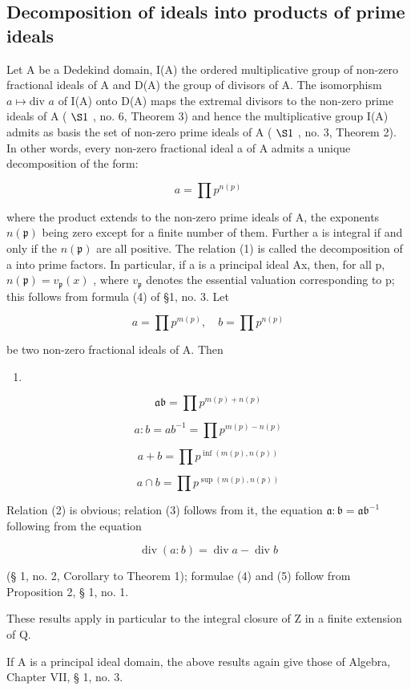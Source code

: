 \subsection{Decomposition of ideals into products of prime ideals}

Let A be a Dedekind domain, I(A) the ordered multiplicative group of non-zero fractional ideals of A and D(A) the group of divisors of A. The isomorphism \(a \mapsto \text{div } a\) of I(A) onto D(A) maps the extremal divisors to the non-zero prime ideals of A ( \(\S 1\) , no. 6, Theorem 3) and hence the multiplicative group I(A) admits as basis the set of non-zero prime ideals of A ( \(\S 1\) , no. 3, Theorem 2). In other words, every non-zero fractional ideal a of A admits a unique decomposition of the form:

\[
a = \prod p ^ {n (p)}\tag{1}
\]

where the product extends to the non-zero prime ideals of A, the exponents \(n(\mathfrak{p})\) being zero except for a finite number of them. Further a is integral if and only if the \(n(\mathfrak{p})\) are all positive. The relation (1) is called the decomposition of a into prime factors. In particular, if a is a principal ideal Ax, then, for all p, \(n(\mathfrak{p}) = v_{\mathfrak{p}}(x)\) , where \(v_{\mathfrak{p}}\) denotes the essential valuation corresponding to p; this follows from formula (4) of §1, no. 3. Let

\[
a = \prod p ^ {m (p)}, \quad b = \prod p ^ {n (p)}
\]

be two non-zero fractional ideals of A. Then

\begin{enumerate}
\def\labelenumi{(\arabic{enumi})}
\setcounter{enumi}{1}
\tightlist
\item
\end{enumerate}

\[
\mathfrak {a b} = \prod p ^ {m (p) + n (p)}\tag{3}
\]

\[
a: b = a b ^ {- 1} = \prod p ^ {m (p) - n (p)}\tag{4}
\]

\[
a + b = \prod p ^ {\inf (m (p), n (p))}\tag{5}
\]

\[
a \cap b = \prod p ^ {\sup (m (p), n (p))}
\]

Relation (2) is obvious; relation (3) follows from it, the equation \(\mathfrak{a} \colon \mathfrak{b} = \mathfrak{ab}^{-1}\) following from the equation

\[
\operatorname{div} (a: b) = \operatorname{div} a - \operatorname{div} b
\]

(§ 1, no. 2, Corollary to Theorem 1); formulae (4) and (5) follow from Proposition 2, § 1, no. 1.

These results apply in particular to the integral closure of Z in a finite extension of Q.

If A is a principal ideal domain, the above results again give those of Algebra, Chapter VII, § 1, no. 3.

